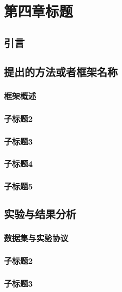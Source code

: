 \chapter{第四章标题}

\section{引言}

\section{提出的方法或者框架名称}

\subsection{框架概述}

\subsection{子标题2}

\subsection{子标题3}

\subsection{子标题4}

\subsection{子标题5}

\section{实验与结果分析}

\subsection{数据集与实验协议}

\subsection{子标题2}

\subsection{子标题3}

